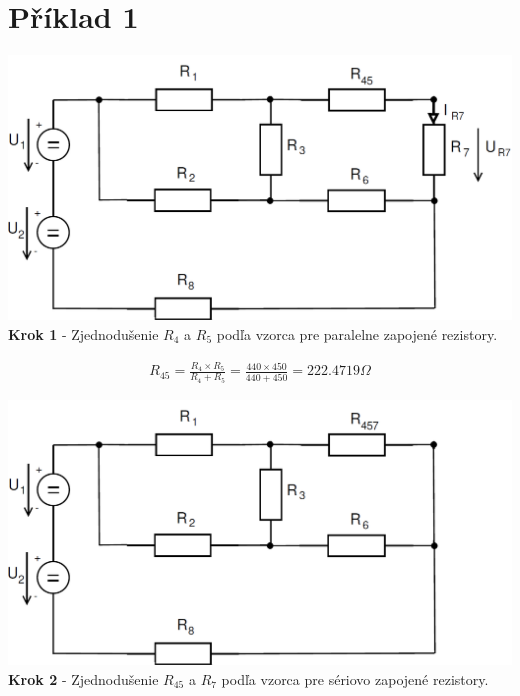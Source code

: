 \section{Příklad 1}

 
\begin{center}
\includegraphics[scale=0.5,keepaspectratio]{fig/obr/Pr1_1.png} \\
\textbf{Krok 1} - Zjednodušenie $R_{4}$ a $R_{5}$ podľa vzorca pre paralelne zapojené rezistory.
\end{center}

\begin{gather*}
R_{45}=\frac{R_{4} \times R_{5}}{R_{4}+R_{5}}=\frac{440 \times 450}{440+450}=222.4719\Omega 
\end{gather*}



\begin{center}
\includegraphics[scale=0.5,keepaspectratio]{fig/obr/Pr1_2.png} \\
\textbf{Krok 2} - Zjednodušenie $R_{45}$ a $R_{7}$ podľa vzorca pre sériovo zapojené rezistory.
\end{center}

